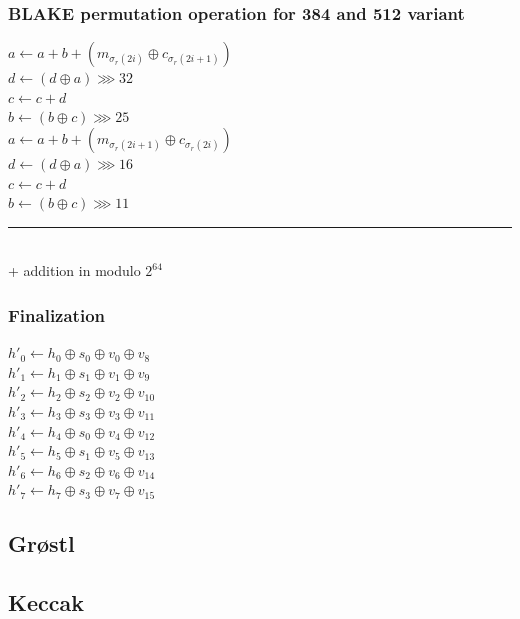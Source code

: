 \documentclass{beamer}
\begin{document}
\begin{frame}
\frametitle{BLAKE permutation operation for 384 and 512 variant}
$a \gets a + b + (m_{\sigma_{r}(2i)} \oplus c_{\sigma_{r}(2i + 1)})$ \\
$d \gets (d \oplus a) \ggg 32$ \\
$c \gets c + d$ \\
$b \gets (b \oplus c) \ggg 25$ \\
$a \gets a + b + (m_{\sigma_{r}(2i + 1)} \oplus c_{\sigma_{r}(2i)})$ \\
$d \gets (d \oplus a) \ggg 16$ \\
$c \gets c + d$ \\
$b \gets (b \oplus c) \ggg 11$ \\
\noindent\rule{10cm}{0.4pt} \\
\vspace{1mm}
+ addition in modulo $2^{64}$ \\
\end{frame}

\begin{frame}
\frametitle{Finalization}
$h'_{0} \gets h_{0} \oplus s_{0} \oplus v_{0} \oplus v_{8}$ \\
$h'_{1} \gets h_{1} \oplus s_{1} \oplus v_{1} \oplus v_{9}$ \\
$h'_{2} \gets h_{2} \oplus s_{2} \oplus v_{2} \oplus v_{10}$ \\
$h'_{3} \gets h_{3} \oplus s_{3} \oplus v_{3} \oplus v_{11}$ \\
$h'_{4} \gets h_{4} \oplus s_{0} \oplus v_{4} \oplus v_{12}$ \\
$h'_{5} \gets h_{5} \oplus s_{1} \oplus v_{5} \oplus v_{13}$ \\
$h'_{6} \gets h_{6} \oplus s_{2} \oplus v_{6} \oplus v_{14}$ \\
$h'_{7} \gets h_{7} \oplus s_{3} \oplus v_{7} \oplus v_{15}$ \\
\end{frame}

\subsection{Gr{\o}stl}

\begin{frame}
\end{frame}

\subsection{Keccak}
\end{document}
